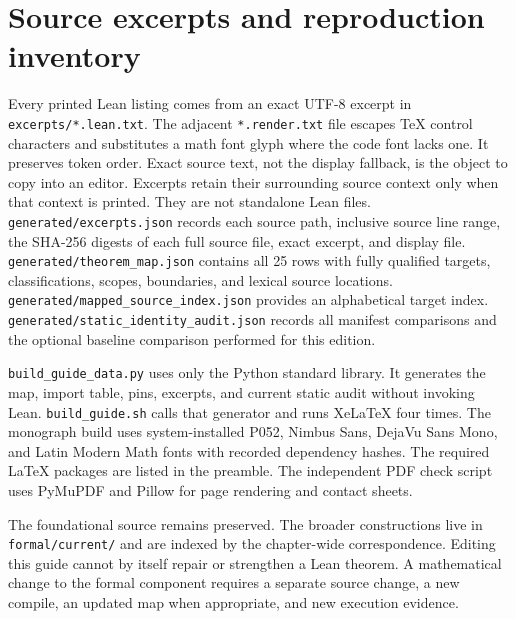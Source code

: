 \documentclass[11pt,a4paper]{article}
\newcommand{\code}[1]{\nolinkurl{#1}}
\begin{document}
\section{Source excerpts and reproduction inventory}\label{app:inventory}
Every printed Lean listing comes from an exact UTF-8 excerpt in \code{excerpts/*.lean.txt}. The adjacent \code{*.render.txt} file escapes TeX control characters and substitutes a math font glyph where the code font lacks one. It preserves token order. Exact source text, not the display fallback, is the object to copy into an editor. Excerpts retain their surrounding source context only when that context is printed. They are not standalone Lean files.
\code{generated/excerpts.json} records each source path, inclusive source line range, the SHA-256 digests of each full source file, exact excerpt, and display file. \code{generated/theorem_map.json} contains all 25 rows with fully qualified targets, classifications, scopes, boundaries, and lexical source locations. \code{generated/mapped_source_index.json} provides an alphabetical target index. \code{generated/static_identity_audit.json} records all manifest comparisons and the optional baseline comparison performed for this edition.

\code{build_guide_data.py} uses only the Python standard library. It generates the map, import table, pins, excerpts, and current static audit without invoking Lean. \code{build_guide.sh} calls that generator and runs XeLaTeX four times. The monograph build uses system-installed P052, Nimbus Sans, DejaVu Sans Mono, and Latin Modern Math fonts with recorded dependency hashes. The required LaTeX packages are listed in the preamble. The independent PDF check script uses PyMuPDF and Pillow for page rendering and contact sheets.

The foundational source remains preserved. The broader constructions live in \code{formal/current/} and are indexed by the chapter-wide correspondence. Editing this guide cannot by itself repair or strengthen a Lean theorem. A mathematical change to the formal component requires a separate source change, a new compile, an updated map when appropriate, and new execution evidence.
\end{document}
